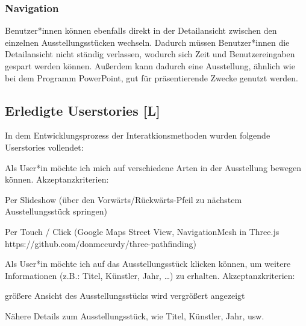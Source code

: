 \subsubsection{Navigation}
Benutzer*innen können ebenfalls direkt in der Detailansicht zwischen den einzelnen Ausstellungsstücken wechseln. Dadurch müssen Benutzer*innen die Detailansicht nicht ständig verlassen, wodurch sich Zeit und Benutzereingaben gespart werden können. Außerdem kann dadurch eine Ausstellung, ähnlich wie bei dem Programm PowerPoint, gut für präsentierende Zwecke genutzt werden. 



\subsection{Erledigte Userstories [L]}
In dem Entwicklungsprozess der Interatkionsmethoden wurden folgende Userstories vollendet:

\begin{compactenum}       
  \item Als User*in möchte ich mich auf verschiedene Arten in der Ausstellung bewegen können. Akzeptanzkriterien:
  \begin{compactitem}
      \item Per Slideshow (über den Vorwärts/Rückwärts-Pfeil zu nächstem Ausstellungsstück springen)
      \item Per Touch / Click (Google Maps Street View, NavigationMesh in Three.js https://github.com/donmccurdy/three-pathfinding)
  \end{compactitem}
  \item  Als User*in möchte ich auf das Ausstellungsstück klicken können, um weitere Informationen (z.B.: Titel, Künstler, Jahr, …) zu erhalten. Akzeptanzkriterien:
  \begin{compactitem}
      \item größere Ansicht des Ausstellungsstücks wird vergrößert angezeigt
      \item Nähere Details zum Ausstellungsstück, wie Titel, Künstler, Jahr, usw.
  \end{compactitem}
\end{compactenum}